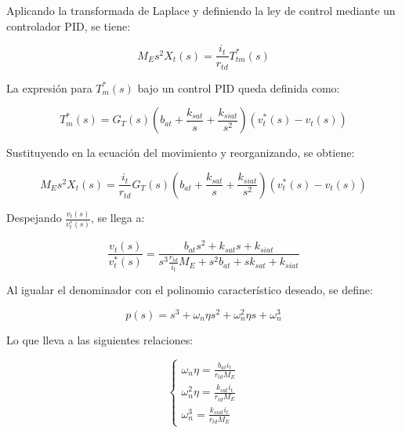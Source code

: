 \documentclass{article}
\begin{document}
            Aplicando la transformada de Laplace y definiendo la ley de control mediante un controlador PID, se tiene:
            
            \begin{equation}
                M_E s^2 X_t(s) =  \frac{i_t}{r_{td}} T_{tm}^*(s)
            \end{equation}
            
            La expresión para $T_m^*(s)$ bajo un control PID queda definida como:
            
            \begin{equation}
                T_m^*(s) = G_T(s)\left( b_{at} + \frac{k_{sat}}{s} + \frac{k_{siat}}{s^2} \right)(v_t^*(s) - v_t(s))
            \end{equation}
            
            Sustituyendo en la ecuación del movimiento y reorganizando, se obtiene:
            
            \begin{equation}
                M_E s^2 X_t(s) =  \frac{i_t}{r_{td}} G_T(s)\left( b_{at} + \frac{k_{sat}}{s} + \frac{k_{siat}}{s^2} \right)(v_t^*(s) - v_t(s))
            \end{equation}
            
            Despejando $\frac{v_t(s)}{v_t^*(s)}$, se llega a:
            
            \begin{equation}
                \frac{v_t(s)}{v_t^*(s)} = \frac{b_{at} s^2 + k_{sat}s + k_{siat}}{s^3 \frac{r_{td}}{i_t}M_E + s^2 b_{at} + s k_{sat} + k_{siat}}
            \end{equation}
            
            Al igualar el denominador con el polinomio característico deseado, se define:
            
            \begin{equation}\label{(eq:polinomio)}
                p(s) = s^3 + \omega_n \eta s^2 + \omega_n^2 \eta s + \omega_n^3
            \end{equation}
            
            Lo que lleva a las siguientes relaciones:
            
            \begin{equation}
                \begin{cases}
                    \omega_n \eta = \frac{b_{at} i_t}{r_{td}M_E} \\
                    \omega_n^2 \eta = \frac{k_{sat} i_t}{r_{td}M_E} \\
                    \omega_n^3 = \frac{k_{siat} i_t}{r_{td}M_E}
                \end{cases}
            \end{equation}
            
\end{document}
